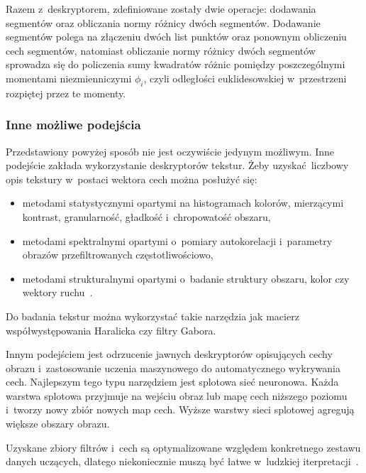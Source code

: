 Razem z~deskryptorem, zdefiniowane zostały dwie operacje: dodawania segmentów oraz obliczania normy różnicy dwóch segmentów. Dodawanie segmentów polega na złączeniu dwóch list punktów oraz ponownym obliczeniu cech segmentów, natomiast obliczanie normy różnicy dwóch segmentów sprowadza się do policzenia sumy kwadratów różnic pomiędzy poszczególnymi momentami niezmienniczymi $\phi_{i}$, czyli odległości euklidesowskiej w~przestrzeni rozpiętej przez te momenty.

\subsubsection{Inne możliwe podejścia}
Przedstawiony powyżej sposób nie jest oczywiście jedynym możliwym. Inne podejście zakłada wykorzystanie deskryptorów tekstur. Żeby uzyskać liczbowy opis tekstury w~postaci wektora cech można posłużyć się:
\begin{itemize}
    \item metodami statystycznymi opartymi na histogramach kolorów, mierzącymi kontrast, granularność, gładkość i~chropowatość obszaru,
    \item metodami spektralnymi opartymi o~pomiary autokorelacji i~parametry obrazów przefiltrowanych częstotliwościowo,
    \item metodami strukturalnymi opartymi o~badanie struktury obszaru, kolor czy wektory ruchu~\cite{perm:wyklad}.
\end{itemize} 

Do badania tekstur można wykorzystać takie narzędzia jak macierz współwystępowania Haralicka czy filtry Gabora. 

Innym podejściem jest odrzucenie jawnych deskryptorów opisujących cechy obrazu i~zastosowanie uczenia maszynowego do automatycznego wykrywania cech. Najlepszym tego typu narzędziem jest splotowa sieć neuronowa. Każda warstwa splotowa przyjmuje na wejściu obraz lub mapę cech niższego poziomu i~tworzy nowy zbiór nowych map cech. Wyższe warstwy sieci splotowej agregują większe obszary obrazu. 

Uzyskane zbiory filtrów i~cech są optymalizowane względem konkretnego zestawu danych uczących, dlatego niekoniecznie muszą być łatwe w~ludzkiej iterpretacji~\cite{perm:wyklad}.